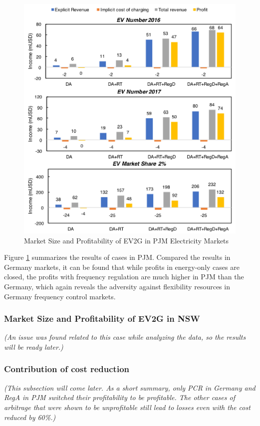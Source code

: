 \begin{figure}[h!]
	\centering
	\includegraphics[width=0.95\linewidth]{Figures/PJM_EV_profit}
	\caption{Market Size and Profitability of EV2G in PJM Electricity Markets}
	\label{fig:PJM_EV}
\end{figure}

Figure \ref{fig:PJM_EV} summarizes the results of cases in PJM. Compared the results in Germany markets, it can be found that while profits in energy-only cases are closed, the profits with frequency regulation are much higher in PJM than the Germany, which again reveals the adversity against flexibility resources in Germany frequency control markets.

 
\subsubsection{Market Size and Profitability of EV2G  in NSW}

\textit{(An issue was found related to this case while analyzing the data, so the results will be ready later.)}


\subsubsection{Contribution of cost reduction}
\textit{(This subsection will come later. As a short summary, only PCR in Germany and RegA in PJM switched their profitability to be profitable. The other cases of arbitrage that were shown to be unprofitable still lead to losses even with the cost reduced by 60\%.)}


